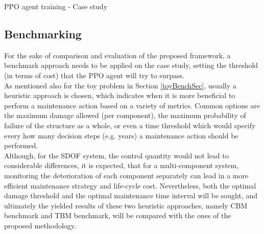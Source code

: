 \begin{algorithm}
    \caption{\acrfull{PPO} agent training - Case study}
    \label{PPOtrainAgentCase}
        
\end{algorithm}

\newpage


\subsection{Benchmarking}

For the sake of comparison and evaluation of the proposed framework, a benchmark approach needs to be applied on the case study, setting the threshold (in terms of cost) that the \gls{PPO} agent will try to surpass.\\

As mentioned also for the toy problem in Section \ref{toyBenchSec}, usually a heuristic approach is chosen, which indicates when it is more beneficial to perform a maintenance action based on a variety of metrics. Common options are the maximum damage allowed (per component), the maximum probability of failure of the structure as a whole, or even a time threshold which would specify every how many decision steps (e.g. years) a maintenance action should be performed.\\

Although, for the \gls{SDOF} system, the control quantity would not lead to considerable differences, it is expected, that for a multi-component system, monitoring the deterioration of each component separately can lead in a more efficient maintenance strategy and life-cycle cost. Nevertheless, both the optimal damage threshold and the optimal maintenance time interval will be sought, and ultimately the yielded results of these two heuristic approaches, namely \gls{CBM} benchmark and \gls{TBM} benchmark, will be compared with the ones of the proposed methodology.\\

